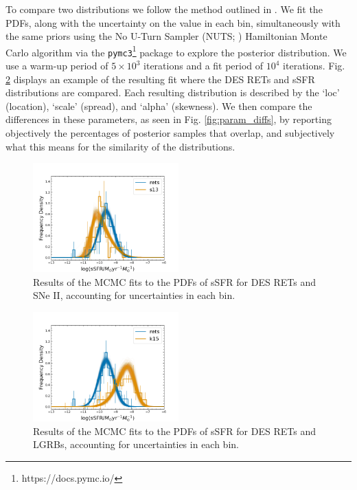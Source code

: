 \documentclass[fleqn,usenatbib,]{mnras}
\newcommand{\replychris}[1]{\color{magenta}#1 \color{black}}
\begin{document}
\replychris{To compare two distributions we follow the method outlined in \citet{Wiseman2020}. We fit the PDFs, along with the uncertainty on the value in each bin, simultaneously with the same priors using the No U-Turn Sampler (NUTS; \citealt{Hoffman2014}) Hamiltonian Monte Carlo algorithm via the  \texttt{pymc3}\footnote{https://docs.pymc.io/} package to explore the posterior distribution. We use a warm-up period of $5\times10^3$ iterations and a fit period of $10^4$ iterations. Fig. \ref{fig:histfit} displays an example of the resulting fit where the DES RETs and \citet{Sanders2012} sSFR distributions are compared. Each resulting distribution is described by the `loc' (location), `scale' (spread), and `alpha' (skewness). We then compare the differences in these parameters, as seen in Fig. \ref{fig:param_diffs}, by reporting objectively the percentages of posterior samples that overlap, and subjectively what this means for the similarity of the distributions.} 
\twocolumn
\begin{figure}
\includegraphics[width=0.5\textwidth]{mc_figs/rets_s13_histfit_ssfr_final.png}
\caption{Results of the MCMC fits to the PDFs of sSFR for DES RETs and SNe II, accounting for uncertainties in each bin.
\label{fig:histfit}}
\end{figure}
\begin{figure}
\includegraphics[width=0.5\textwidth]{mc_figs/rets_k15_histfit_ssfr_final.png}
\caption{Results of the MCMC fits to the PDFs of sSFR for DES RETs and LGRBs, accounting for uncertainties in each bin.
\label{fig:histfit}}
\end{figure}
\end{document}
